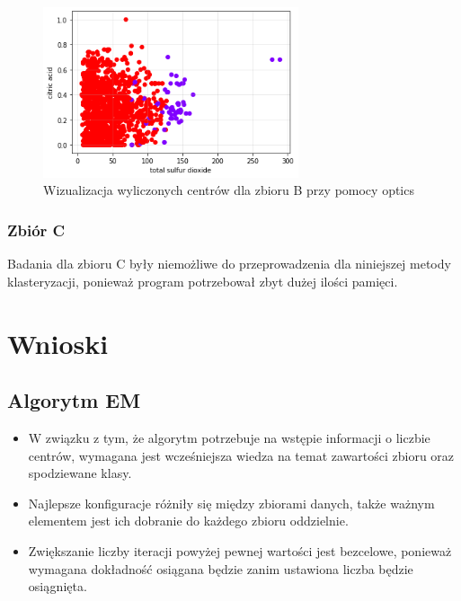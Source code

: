 \documentclass[a4paper,11pt]{article}
\begin{document}
\begin{figure}[!htbp]
    \centering
    \includegraphics[width=0.67\textwidth]{images2/op/opB40.png}
    \caption{Wizualizacja wyliczonych centrów dla zbioru B przy pomocy optics}
    \label{fig:op_i_2}
\end{figure}
\subsubsection*{Zbiór C}
Badania dla zbioru C były niemożliwe do przeprowadzenia dla niniejszej metody klasteryzacji, ponieważ program potrzebował zbyt dużej ilości pamięci.

\newpage

\section{Wnioski}

\subsection*{Algorytm EM}
\begin{itemize}
    \item W związku z tym, że algorytm potrzebuje na wstępie informacji o liczbie centrów, wymagana jest wcześniejsza wiedza na temat zawartości zbioru oraz spodziewane klasy.
    \item Najlepsze konfiguracje różniły się między zbiorami danych, także ważnym elementem jest ich dobranie do każdego zbioru oddzielnie.
    \item Zwiększanie liczby iteracji powyżej pewnej wartości jest bezcelowe, ponieważ wymagana dokładność osiągana będzie zanim ustawiona liczba będzie osiągnięta.
\end{itemize}
\end{document}
